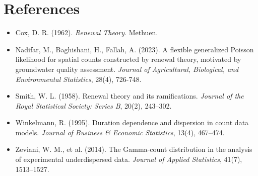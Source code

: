 \documentclass[a4paper,11pt]{article}
\begin{document}
\section*{References}
\begin{itemize}
\item  Cox, D. R. (1962). \textit{Renewal Theory}. Methuen.
\item  Nadifar, M., Baghishani, H., Fallah, A. (2023). A flexible
    generalized Poisson likelihood for spatial counts constructed by
    renewal theory, motivated by groundwater quality assessment.
    \textit{Journal of Agricultural, Biological, and Environmental
        Statistics}, 28(4), 726-748.
\item  Smith, W. L. (1958). Renewal theory and its ramifications.
    \textit{Journal of the Royal Statistical Society: Series B},
    20(2), 243–302.
\item  Winkelmann, R. (1995). Duration dependence and dispersion in
    count data models. \textit{Journal of Business \& Economic
        Statistics}, 13(4), 467–474.
\item  Zeviani, W. M., et al. (2014). The Gamma-count distribution
    in the analysis of experimental underdispersed data.
    \textit{Journal of Applied Statistics}, 41(7), 1513–1527.
\end{itemize}
\end{document}
